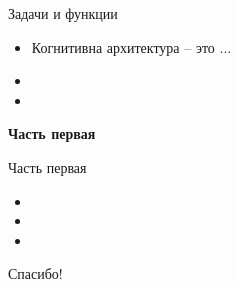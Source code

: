 \documentclass{beamer}
\begin{document}
\begin{frame}{Задачи и функции}
\begin{itemize}
	\item Когнитивна архитектура -- это ...
	\medskip
	\item 
	\medskip
	\item  
\end{itemize}
\end{frame}




\begin{frame}{}
\begin{center}
	\textbf{Часть первая}
\end{center}
\end{frame}

\begin{frame}{Часть первая}
\begin{itemize}
	\item 
	\medskip
	\item 
	\medskip
	\item  
\end{itemize}
\end{frame}




\begin{frame}{}
    \thispagestyle{empty}
    \begin{center}
        {\large Спасибо!}
    \end{center}
\end{frame}
\end{document}
